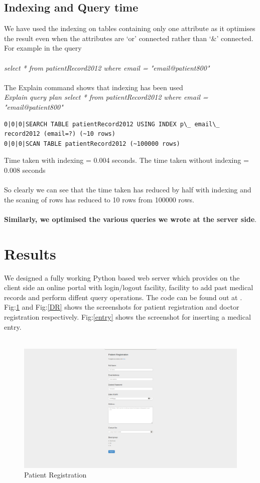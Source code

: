 \documentclass{article}
\begin{document}
\subsection{Indexing and Query time}
\vspace{0.1in}
We have used the indexing on tables containing only one attribute as it optimises the result even when the attributes are `or' connected rather than `\&' connected\cite{bib5}. For example in the query\\\\{\it select * from patientRecord2012 where email = "email@patient800"}\\\\
The Explain command shows that indexing has been used\\
{\it Explain query plan select * from patientRecord2012 where email = "email@patient800"}
\begin{lstlisting}
0|0|0|SEARCH TABLE patientRecord2012 USING INDEX p\_ email\_ record2012 (email=?) (~10 rows)
0|0|0|SCAN TABLE patientRecord2012 (~100000 rows)
\end{lstlisting}

Time taken with indexing = 0.004 seconds. The time taken without indexing = 0.008 seconds\\\\
So clearly we can see that the time taken has reduced by half with indexing and the scaning of rows has reduced to 10 rows from 100000 rows.\\\\{\bf Similarly, we optimised the various queries we wrote at the server side}.

\newpage
\section{Results}

We designed a fully working Python based web server which provides on the client side an online portal with login/logout facility, facility to add past medical records and perform diffent query operations. The code can be found out at \cite{bib7}.
Fig:\ref{PR} and Fig:\ref{DR} shows the screenshots for patient registration and doctor registration respectively. Fig:\ref{entry} shows the screenshot for inserting a medical entry.\\\\

\begin{figure}[!htbp]
	\centering
	\includegraphics[width=0.8\columnwidth]{patient_reg.png}
	\caption{Patient Registration}
	\label{PR}
\end{figure}
\end{document}
